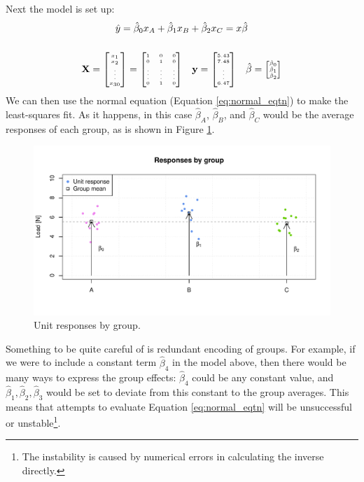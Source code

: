 \documentclass[11pt,a4paper,article]{memoir} %
\begin{document}
Next the model is set up:
\begin{gather}
	\hat{y} = \hat{\beta}_0 x_A + \hat{\beta}_{1}x_B + \hat{\beta}_{2}x_C = x \hat{\beta} \\[5mm]
	\mathbf{X} = 
		{\tiny
			\begin{bmatrix}
				x_1 \\ x_2 \\ \vdots \\ x_{30}
			\end{bmatrix}
			=
			\begin{bmatrix}
				 1 & 0 & 0 \\  0 & 1 & 0 \\ \vdots & \vdots & \vdots \\ 0 & 1 & 0
			\end{bmatrix}}
	\quad \mathbf{y} = {\tiny \begin{bmatrix} 5.43 \\ 7.48 \\ \vdots \\ 6.47 \end{bmatrix}}
	\quad \hat{\beta} = {\tiny \begin{bmatrix} \hat{\beta}_0 \\ \hat{\beta}_1 \\ \hat{\beta}_2 \end{bmatrix}}
\end{gather}
We can then use the normal equation (Equation \ref{eq:normal_eqtn}) to make the least-squares fit. As it happens, in this case $\hat{\beta}_A$, $\hat{\beta}_B$, and $\hat{\beta}_C$ would be the average responses of each group, as is shown in Figure \ref{fig:categorical_regression}.
\begin{figure}[h]
\includegraphics[width=\textwidth]{categorical_regression.pdf}
\caption{Unit responses by group.}
\label{fig:categorical_regression}
\end{figure}
 Something to be quite careful of is redundant encoding of groups. For example, if we were to include a constant term $\hat{\beta}_4$ in the model above, then there would be many ways to express the group effects: $\hat{\beta}_4$ could be any constant value, and $\hat{\beta}_1, \hat{\beta}_2, \hat{\beta}_3$ would be set to deviate from this constant to the group averages. This means that attempts to evaluate Equation \ref{eq:normal_eqtn} will be unsuccessful or unstable\footnote{The instability is caused by numerical errors in calculating the inverse directly.}.
\end{document}
